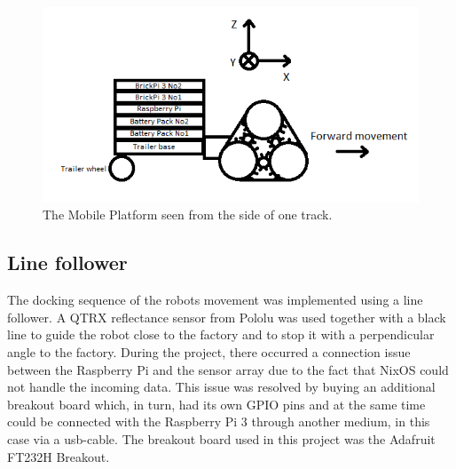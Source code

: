\begin{figure}[h]
    \centering
    \includegraphics[width =\textwidth]{sections/assets/Trailer.PNG}
    \caption{The Mobile Platform seen from the side of one track.}
    \label{Trailer}
\end{figure}

\subsection{Line follower}

The docking sequence of the robots movement was implemented using a line follower. A QTRX reflectance sensor from Pololu was used together with a black line to guide the robot close to the factory and to stop it with a perpendicular angle to the factory. During the project, there occurred a connection issue between the Raspberry Pi and the sensor array due to the fact that  NixOS could not handle the incoming data. This issue was resolved by buying an additional breakout board which, in turn, had its own GPIO pins and at the same time could be connected with the Raspberry Pi 3 through another medium, in this case via a usb-cable. The breakout board used in this project was the Adafruit FT232H Breakout.


